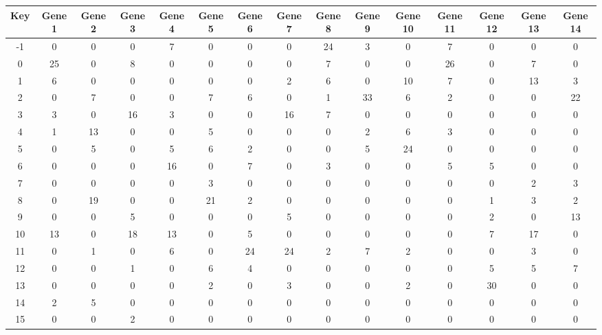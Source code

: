 \begin{tabular}{|c|c|c|c|c|c|c|c|c|c|c|c|c|c|c|}
\hline
Key & Gene 1 & Gene 2 & Gene 3 & Gene 4 & Gene 5 & Gene 6 & Gene 7 & Gene 8 & Gene 9 & Gene 10 & Gene 11 & Gene 12 & Gene 13 & Gene 14 \\
\hline
-1 & 0 & 0 & 0 & 7 & 0 & 0 & 0 & 24 & 3 & 0 & 7 & 0 & 0 & 0 \\
0 & 25 & 0 & 8 & 0 & 0 & 0 & 0 & 7 & 0 & 0 & 26 & 0 & 7 & 0 \\
1 & 6 & 0 & 0 & 0 & 0 & 0 & 2 & 6 & 0 & 10 & 7 & 0 & 13 & 3 \\
2 & 0 & 7 & 0 & 0 & 7 & 6 & 0 & 1 & 33 & 6 & 2 & 0 & 0 & 22 \\
3 & 3 & 0 & 16 & 3 & 0 & 0 & 16 & 7 & 0 & 0 & 0 & 0 & 0 & 0 \\
4 & 1 & 13 & 0 & 0 & 5 & 0 & 0 & 0 & 2 & 6 & 3 & 0 & 0 & 0 \\
5 & 0 & 5 & 0 & 5 & 6 & 2 & 0 & 0 & 5 & 24 & 0 & 0 & 0 & 0 \\
6 & 0 & 0 & 0 & 16 & 0 & 7 & 0 & 3 & 0 & 0 & 5 & 5 & 0 & 0 \\
7 & 0 & 0 & 0 & 0 & 3 & 0 & 0 & 0 & 0 & 0 & 0 & 0 & 2 & 3 \\
8 & 0 & 19 & 0 & 0 & 21 & 2 & 0 & 0 & 0 & 0 & 0 & 1 & 3 & 2 \\
9 & 0 & 0 & 5 & 0 & 0 & 0 & 5 & 0 & 0 & 0 & 0 & 2 & 0 & 13 \\
10 & 13 & 0 & 18 & 13 & 0 & 5 & 0 & 0 & 0 & 0 & 0 & 7 & 17 & 0 \\
11 & 0 & 1 & 0 & 6 & 0 & 24 & 24 & 2 & 7 & 2 & 0 & 0 & 3 & 0 \\
12 & 0 & 0 & 1 & 0 & 6 & 4 & 0 & 0 & 0 & 0 & 0 & 5 & 5 & 7 \\
13 & 0 & 0 & 0 & 0 & 2 & 0 & 3 & 0 & 0 & 2 & 0 & 30 & 0 & 0 \\
14 & 2 & 5 & 0 & 0 & 0 & 0 & 0 & 0 & 0 & 0 & 0 & 0 & 0 & 0 \\
15 & 0 & 0 & 2 & 0 & 0 & 0 & 0 & 0 & 0 & 0 & 0 & 0 & 0 & 0 \\
\hline
\end{tabular}